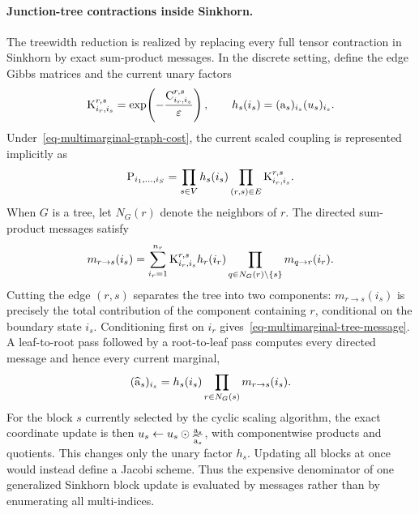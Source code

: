 \paragraph{Junction-tree contractions inside Sinkhorn.}

The treewidth reduction is realized by replacing every full tensor contraction in Sinkhorn by exact sum-product messages. In the discrete setting, define the edge Gibbs matrices and the current unary factors
\[
	\mathrm{K}^{r,s}_{i_r,i_s}
	=
	\exp\!\left(-\frac{\mathrm{C}^{r,s}_{i_r,i_s}}{\varepsilon}\right),
	\qquad
	h_s(i_s)
	=
	(\mathrm{a}_s)_{i_s}(u_s)_{i_s}.
\]
Under~\eqref{eq-multimarginal-graph-cost}, the current scaled coupling is represented implicitly as
\begin{equation}\label{eq-multimarginal-graph-factorization}
	\mathrm{P}_{i_1,\ldots,i_S}
	=
	\prod_{s\in V}h_s(i_s)
	\prod_{(r,s)\in E}\mathrm{K}^{r,s}_{i_r,i_s}.
\end{equation}
When $G$ is a tree, let $N_G(r)$ denote the neighbors of $r$. The directed sum-product messages satisfy
\begin{equation}\label{eq-multimarginal-tree-message}
	m_{r\to s}(i_s)
	=
	\sum_{i_r=1}^{n_r}
	\mathrm{K}^{r,s}_{i_r,i_s}h_r(i_r)
	\prod_{q\in N_G(r)\setminus\{s\}}
	m_{q\to r}(i_r).
\end{equation}
Cutting the edge $(r,s)$ separates the tree into two components: $m_{r\to s}(i_s)$ is precisely the total contribution of the component containing $r$, conditional on the boundary state $i_s$. Conditioning first on $i_r$ gives~\eqref{eq-multimarginal-tree-message}. A leaf-to-root pass followed by a root-to-leaf pass computes every directed message and hence every current marginal,
\begin{equation}\label{eq-multimarginal-tree-marginal}
	(\widehat{\mathrm{a}}_s)_{i_s}
	=
	h_s(i_s)
	\prod_{r\in N_G(s)}m_{r\to s}(i_s).
\end{equation}
For the block $s$ currently selected by the cyclic scaling algorithm, the exact coordinate update is then
$u_s \leftarrow u_s\odot\frac{\mathrm{a}_s}{\widehat{\mathrm{a}}_s}$,
with componentwise products and quotients. This changes only the unary factor $h_s$. Updating all blocks at once would instead define a Jacobi scheme. Thus the expensive denominator of one generalized Sinkhorn block update is evaluated by messages rather than by enumerating all multi-indices.

